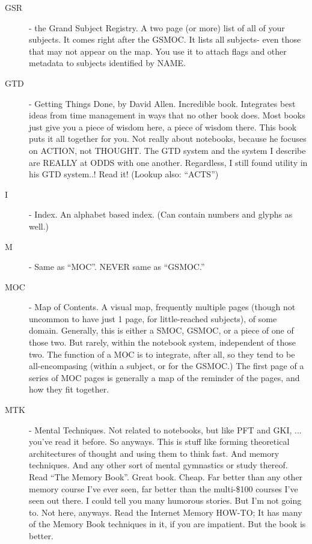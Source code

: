 \documentclass[oneside]{book}
\begin{document}
\begin{description}
\item[GSR] - the Grand Subject Registry. A two page (or more) list of all of
your subjects. It comes right after the GSMOC. It lists all subjects-
even those that may not appear on the map. You use it to attach flags
and other metadata to subjects identified by NAME.

\item[GTD] - Getting Things Done, by David Allen. Incredible book. Integrates
best ideas from time management in ways that no other book does. Most
books just give you a piece of wisdom here, a piece of wisdom
there. This book puts it all together for you. Not really about
notebooks, because he focuses on ACTION, not THOUGHT. The GTD system
and the system I describe are REALLY at ODDS with one
another. Regardless, I still found utility in his GTD system..! Read
it! (Lookup also: ``ACTS'')

\item[I] - Index. An alphabet based index. (Can contain numbers and glyphs as
well.)

\item[M] - Same as ``MOC''. NEVER same as ``GSMOC.''

\item[MOC] - Map of Contents. A visual map, frequently multiple pages (though
not uncommon to have just 1 page, for little-reached subjects), of
some domain. Generally, this is either a SMOC, GSMOC, or a piece of
one of those two. But rarely, within the notebook system, independent
of those two. The function of a MOC is to integrate, after all, so
they tend to be all-encompasing (within a subject, or for the GSMOC.)
The first page of a series of MOC pages is generally a map of the
reminder of the pages, and how they fit together.

\item[MTK] - Mental Techniques. Not related to notebooks, but like PFT and
GKI, ... you've read it before. So anyways. This is stuff like forming
theoretical architectures of thought and using them to think fast. And
memory techniques. And any other sort of mental gymnastics or study
thereof. Read ``The Memory Book''. Great book. Cheap. Far better than
any other memory course I've ever seen, far better than the multi-\$100
courses I've seen out there. I could tell you many humorous
stories. But I'm not going to. Not here, anyways.  Read the
Internet Memory HOW-TO; It has many of the Memory Book techniques in
it, if you are impatient. But the book is better.


\end{description}
\end{document}
